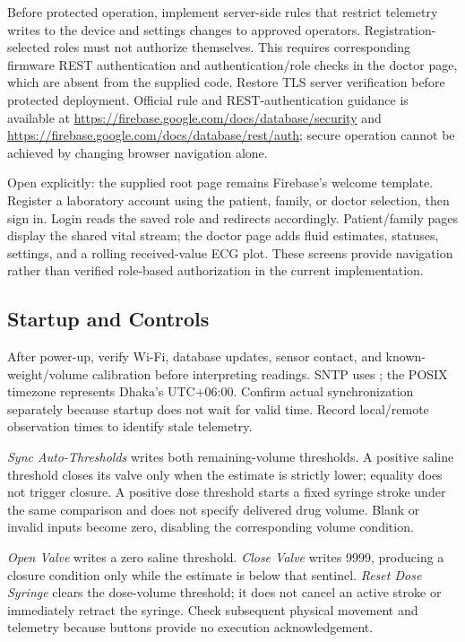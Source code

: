 Before protected operation, implement server-side rules that restrict telemetry writes to the device and settings changes to approved operators. Registration-selected roles must not authorize themselves. This requires corresponding firmware REST authentication and authentication/role checks in the doctor page, which are absent from the supplied code. Restore TLS server verification before protected deployment. Official rule and REST-authentication guidance is available at \url{https://firebase.google.com/docs/database/security} and \url{https://firebase.google.com/docs/database/rest/auth}; secure operation cannot be achieved by changing browser navigation alone.

Open  explicitly: the supplied root page remains Firebase's welcome template. Register a laboratory account using the patient, family, or doctor selection, then sign in. Login reads the saved role and redirects accordingly. Patient/family pages display the shared vital stream; the doctor page adds fluid estimates, statuses, settings, and a rolling received-value ECG plot. These screens provide navigation rather than verified role-based authorization in the current implementation.

\subsection{Startup and Controls}
After power-up, verify Wi-Fi, database updates, sensor contact, and known-weight/volume calibration before interpreting readings. SNTP uses ; the POSIX timezone  represents Dhaka's UTC+06:00. Confirm actual synchronization separately because startup does not wait for valid time. Record local/remote observation times to identify stale telemetry.

\emph{Sync Auto-Thresholds} writes both remaining-volume thresholds. A positive saline threshold closes its valve only when the estimate is strictly lower; equality does not trigger closure. A positive dose threshold starts a fixed syringe stroke under the same comparison and does not specify delivered drug volume. Blank or invalid inputs become zero, disabling the corresponding volume condition.

\emph{Open Valve} writes a zero saline threshold. \emph{Close Valve} writes 9999, producing a closure condition only while the estimate is below that sentinel. \emph{Reset Dose Syringe} clears the dose-volume threshold; it does not cancel an active stroke or immediately retract the syringe. Check subsequent physical movement and telemetry because buttons provide no execution acknowledgement.

